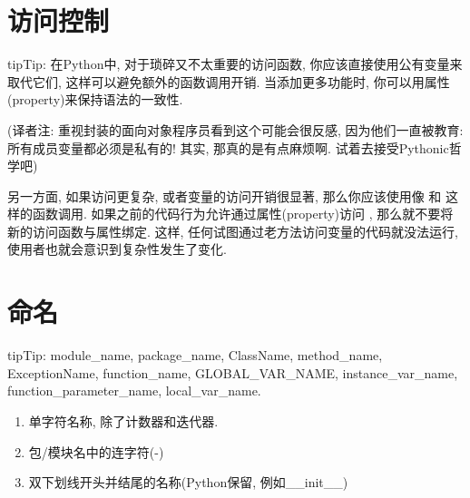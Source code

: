 \documentclass[a4paper,10pt,english]{sphinxmanual}
\begin{document}
\section{访问控制}
\label{\detokenize{python_style_rules:id15}}
\begin{sphinxadmonition}{tip}{Tip:}
在Python中, 对于琐碎又不太重要的访问函数, 你应该直接使用公有变量来取代它们, 这样可以避免额外的函数调用开销. 当添加更多功能时, 你可以用属性(property)来保持语法的一致性.

(译者注: 重视封装的面向对象程序员看到这个可能会很反感, 因为他们一直被教育: 所有成员变量都必须是私有的! 其实, 那真的是有点麻烦啊. 试着去接受Pythonic哲学吧)
\end{sphinxadmonition}

另一方面, 如果访问更复杂, 或者变量的访问开销很显著, 那么你应该使用像  和  这样的函数调用. 如果之前的代码行为允许通过属性(property)访问 , 那么就不要将新的访问函数与属性绑定. 这样, 任何试图通过老方法访问变量的代码就没法运行, 使用者也就会意识到复杂性发生了变化.


\section{命名}
\label{\detokenize{python_style_rules:id16}}
\begin{sphinxadmonition}{tip}{Tip:}
module\_name, package\_name, ClassName, method\_name, ExceptionName, function\_name, GLOBAL\_VAR\_NAME, instance\_var\_name, function\_parameter\_name, local\_var\_name.
\end{sphinxadmonition}

\begin{enumerate}
\item {} 
单字符名称, 除了计数器和迭代器.

\item {} 
包/模块名中的连字符(-)

\item {} 
双下划线开头并结尾的名称(Python保留, 例如\_\_init\_\_)

\end{enumerate}
\end{document}
